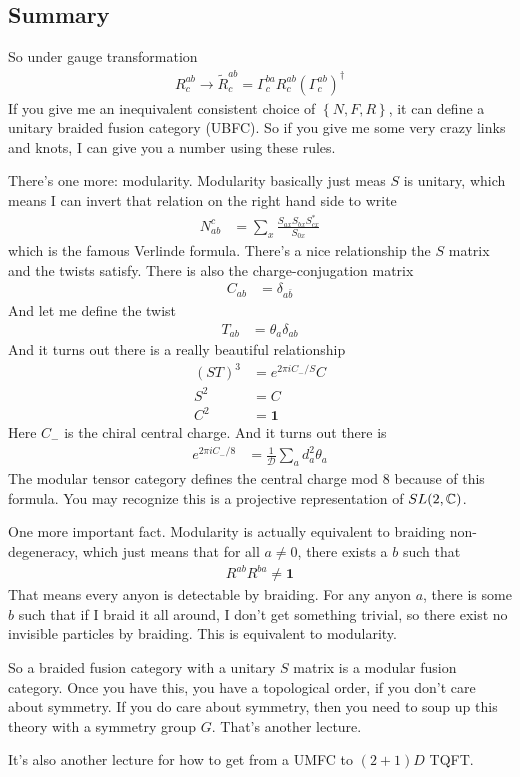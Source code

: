 \subsection{Summary}
So under gauge transformation
\begin{align}
    R_{c}^{ab}
    \to
    \tilde{R}_{c}^{ab}
    =
    \Gamma_{c}^{ba}
    R_{c}^{ab}\left( \Gamma_{c}^{ab} \right)^\dagger
\end{align}
If you give me an inequivalent consistent choice of $\left\{ N,F,R \right\}$,
it can define a unitary braided fusion category (UBFC).
So if you give me some very crazy links and knots,
I can give you a number using these rules.

There's one more: modularity.
Modularity basically just meas $S$ is unitary,
which means I can invert that relation on the right hand side to write
\begin{align}
    N_{ab}^{c}
    &=
    \sum_{x}
    \frac{S_{ax} S_{bx} S_{cx}^*}{S_{0x}}
\end{align}
which is the famous Verlinde formula.
There's a nice relationship the $S$ matrix and the twists satisfy.
There is also the charge-conjugation matrix
\begin{align}
    C_{ab} &=
    \delta_{a\bar{b}}
\end{align}
And let me define the twist
\begin{align}
    T_{ab}
    &=
    \theta_a \delta_{ab}
\end{align}
And it turns out there is a really beautiful relationship
\begin{align}
    \left( ST \right)^3 &=
    e^{2\pi i C_{-}/S} C\\
    S^2 &= C\\
    C^2 &= \mathbf{1}
\end{align}
Here $C_-$ is the chiral central charge.
And it turns out there is 
\begin{align}
    e^{2\pi i C_{-}/8}
    &=
    \frac{1}{\mathcal{D}}
    \sum_{a}
    d_a^2
    \theta_a
\end{align}
The modular tensor category defines the central charge mod 8 because of this
formula.
You may recognize this is a projective representation of $SL(2,\mathbb{C})$.

One more important fact.
Modularity is actually equivalent to braiding non-degeneracy,
which just means that
for all $a\ne 0$,
there exists a $b$ such that
\begin{align}
    R^{ab}R^{ba} \ne \mathbf{1}
\end{align}
That means every anyon is detectable by braiding.
For any anyon $a$,
there is some $b$ such that if I braid it all around,
I don't get something trivial,
so there exist no invisible particles by braiding.
This is equivalent to modularity.

So a braided fusion category with a unitary $S$ matrix is a modular fusion
category.
Once you have this,
you have a topological order,
if you don't care about symmetry.
If you do care about symmetry,
then you need to soup up this theory with a symmetry group $G$.
That's another lecture.

It's also another lecture for how to get from a UMFC to  $(2+1)D$ TQFT.
